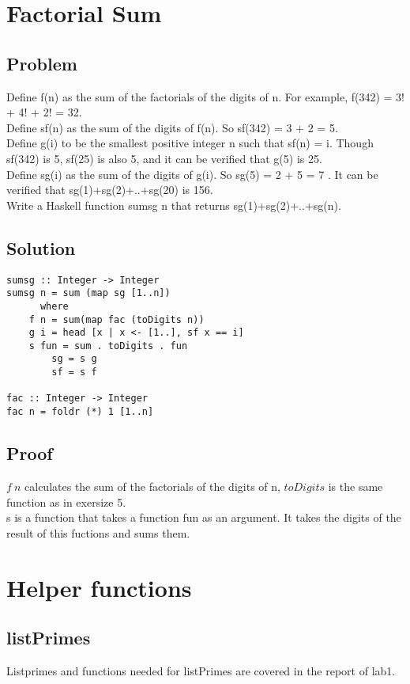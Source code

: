 \documentclass[a4paper,11pt]{article}
\begin{document}
\section{Factorial Sum}
\subsection{Problem}

Define f(n) as the sum of the factorials of the digits of n. For example, f(342) = 3!  + 4!  + 2!  = 32.\\
Define sf(n) as the sum of the digits of f(n). So sf(342) = 3 + 2 = 5.\\
Define g(i) to be the smallest positive integer n such that sf(n) = i. Though sf(342) is 5, sf(25)
is also 5,  and it can be verified that g(5) is 25.\\
Define sg(i) as  the  sum  of  the  digits  of g(i).   So sg(5) = 2 + 5 = 7 . It  can  be  verified  that sg(1)+sg(2)+..+sg(20) is 156.\\
Write a Haskell function sumsg n that returns sg(1)+sg(2)+..+sg(n).
\subsection{Solution}

\begin{lstlisting}
sumsg :: Integer -> Integer
sumsg n = sum (map sg [1..n])
      where
	f n = sum(map fac (toDigits n))
	g i = head [x | x <- [1..], sf x == i]
	s fun = sum . toDigits . fun
      	sg = s g
      	sf = s f

fac :: Integer -> Integer
fac n = foldr (*) 1 [1..n]
\end{lstlisting}

\subsection{Proof}
$f\: n$ calculates the sum of the factorials of the digits of n, $toDigits$ is the same function as in exersize 5. \\
s is a function that takes a function fun as an argument. It takes the digits of the result of this fuctions and sums them.

\section{Helper functions}

\subsection{listPrimes}
Listprimes and functions needed for listPrimes are covered in the report of lab1.
\end{document}
